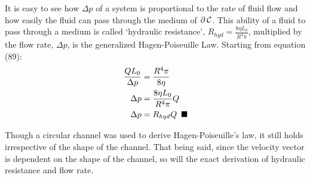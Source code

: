 \documentclass[titlepage]{article}
\begin{document}
        \noindent It is easy to see how $\Delta p$ of a system is proportional to the rate of fluid flow and how easily the fluid can pass through the medium of $\partial\hspace*{2pt}\mathcal{C}$. This ability of a fluid to pass through a medium is called `hydraulic resistance', $R_{hyd}=\displaystyle\frac{8\eta{L_{0}}}{R^4\pi}$, multiplied by the flow rate, $\Delta{p}$, is the generalized Hagen-Poiseuille Law. Starting from equation (89): 
        \begin{align}
            \displaystyle\frac{{Q}{L_{0}}}{\Delta p} &= \displaystyle\frac{R^4\pi}{8\eta} \\
            \Delta p &= \displaystyle\frac{8\eta{L_{0}}}{R^4\pi}{Q} \\
            \Delta{p} &= R_{hyd}Q \hspace*{5pt}\blacksquare
        \end{align}
    \endgroup

    \noindent Though a circular channel was used to derive Hagen-Poiseuille’s law, it still holds irrespective of the shape of the channel. That being said, since the velocity vector is dependent on the shape of the channel, so will the exact derivation of hydraulic resistance and flow rate. 
    
\end{document}
